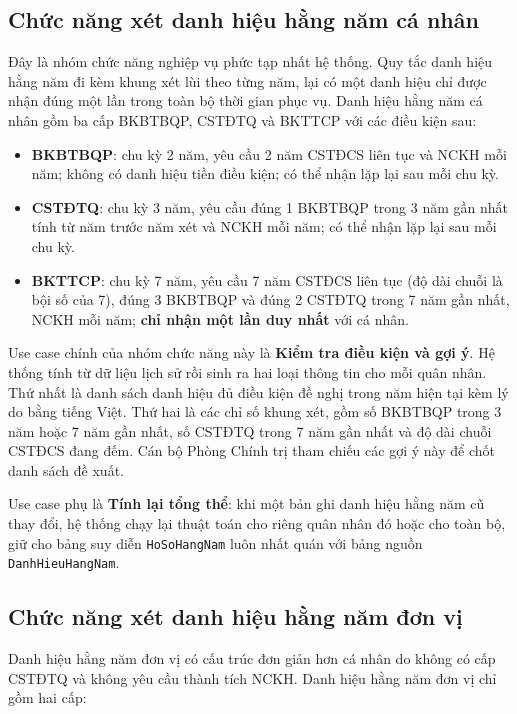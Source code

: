 \documentclass[../DoAn.tex]{subfiles}
\begin{document}
\subsection{Chức năng xét danh hiệu hằng năm cá nhân}
\label{subsection:2.2.5}

Đây là nhóm chức năng nghiệp vụ phức tạp nhất hệ thống. Quy tắc danh hiệu hằng năm đi kèm khung xét lùi theo từng năm, lại có một danh hiệu chỉ được nhận đúng một lần trong toàn bộ thời gian phục vụ. Danh hiệu hằng năm cá nhân gồm ba cấp BKBTBQP, CSTĐTQ và BKTTCP với các điều kiện sau:

\begin{itemize}
    \item \textbf{BKBTBQP}: chu kỳ 2 năm, yêu cầu 2 năm CSTĐCS liên tục và NCKH mỗi năm; không có danh hiệu tiền điều kiện; có thể nhận lặp lại sau mỗi chu kỳ.
    \item \textbf{CSTĐTQ}: chu kỳ 3 năm, yêu cầu đúng 1 BKBTBQP trong 3 năm gần nhất tính từ năm trước năm xét và NCKH mỗi năm; có thể nhận lặp lại sau mỗi chu kỳ.
    \item \textbf{BKTTCP}: chu kỳ 7 năm, yêu cầu 7 năm CSTĐCS liên tục (độ dài chuỗi là bội số của 7), đúng 3 BKBTBQP và đúng 2 CSTĐTQ trong 7 năm gần nhất, NCKH mỗi năm; \textbf{chỉ nhận một lần duy nhất} với cá nhân.
\end{itemize}

Use case chính của nhóm chức năng này là \textbf{Kiểm tra điều kiện và gợi ý}. Hệ thống tính từ dữ liệu lịch sử rồi sinh ra hai loại thông tin cho mỗi quân nhân. Thứ nhất là danh sách danh hiệu đủ điều kiện đề nghị trong năm hiện tại kèm lý do bằng tiếng Việt. Thứ hai là các chỉ số khung xét, gồm số BKBTBQP trong 3 năm hoặc 7 năm gần nhất, số CSTĐTQ trong 7 năm gần nhất và độ dài chuỗi CSTĐCS đang đếm. Cán bộ Phòng Chính trị tham chiếu các gợi ý này để chốt danh sách đề xuất.

Use case phụ là \textbf{Tính lại tổng thể}: khi một bản ghi danh hiệu hằng năm cũ thay đổi, hệ thống chạy lại thuật toán cho riêng quân nhân đó hoặc cho toàn bộ, giữ cho bảng suy diễn \texttt{HoSoHangNam} luôn nhất quán với bảng nguồn \texttt{DanhHieuHangNam}.

\subsection{Chức năng xét danh hiệu hằng năm đơn vị}
\label{subsection:2.2.6}

Danh hiệu hằng năm đơn vị có cấu trúc đơn giản hơn cá nhân do không có cấp CSTĐTQ và không yêu cầu thành tích NCKH. Danh hiệu hằng năm đơn vị chỉ gồm hai cấp:
\end{document}
